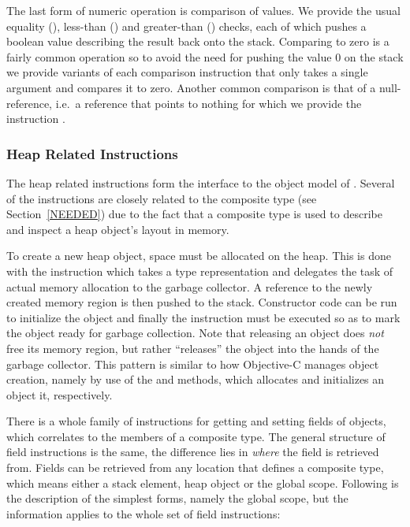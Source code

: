 The last form of numeric operation is comparison of values. We provide the usual
equality (), less-than () and greater-than ()
checks, each of which pushes a boolean value describing the result back onto the
stack. Comparing to zero is a fairly common operation so to avoid the need for
pushing the value $0$ on the stack we provide variants of each comparison
instruction that only takes a single argument and compares it to zero. Another
common comparison is that of a null-reference, i.e.~a reference that points to
nothing for which we provide the instruction .

\subsubsection{Heap Related Instructions}

The heap related instructions form the interface to the object model of
\thename{}. Several of the instructions are closely related to the composite
type (see Section~\ref{NEEDED}) due to the fact that a composite type is used to
describe and inspect a heap object's layout in memory.

To create a new heap object, space must be allocated on the heap. This is done
with the  instruction which takes a type representation and delegates
the task of actual memory allocation to the garbage collector. A reference to
the newly created memory region is then pushed to the stack. Constructor code
can be run to initialize the object and finally the  instruction
must be executed so as to mark the object ready for garbage collection. Note
that releasing an object does \emph{not} free its memory region, but rather
``releases'' the object into the hands of the garbage collector. This pattern is
similar to how Objective-C manages object creation, namely by use of the
 and  methods, which allocates and initializes an object
it, respectively.

There is a whole family of instructions for getting and setting fields of
objects, which correlates to the members of a composite type. The general
structure of field instructions is the same, the difference lies in \emph{where}
the field is retrieved from. Fields can be retrieved from any location that
defines a composite type, which means either a stack element, heap object or the
global scope. Following is the description of the simplest forms, namely the
global scope, but the information applies to the whole set of field
instructions:

